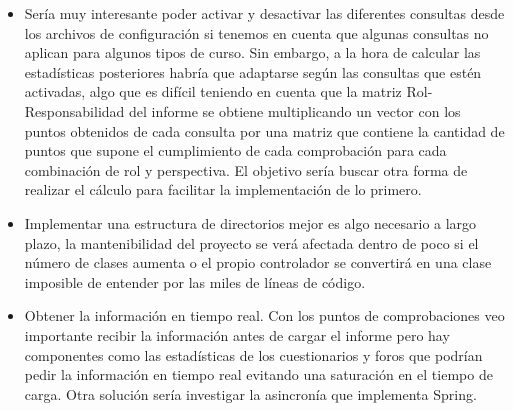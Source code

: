 \begin{itemize}
	\item
	Sería muy interesante poder activar y desactivar las diferentes consultas desde los archivos de configuración si tenemos en cuenta que algunas consultas no aplican para algunos tipos de curso. Sin embargo, a la hora de calcular las estadísticas posteriores habría que adaptarse según las consultas que estén activadas, algo que es difícil teniendo en cuenta que la matriz Rol-Responsabilidad del informe se obtiene multiplicando un vector con los puntos obtenidos de cada consulta por una matriz que contiene la cantidad de puntos que supone el cumplimiento de cada comprobación para cada combinación de rol y perspectiva. El objetivo sería buscar otra forma de realizar el cálculo para facilitar la implementación de lo primero.
	\item
	Implementar una estructura de directorios mejor es algo necesario a largo plazo, la mantenibilidad del proyecto se verá afectada dentro de poco si el número de clases aumenta o el propio controlador se convertirá en una clase imposible de entender por las miles de líneas de código.
	\item
	Obtener la información en tiempo real. Con los puntos de comprobaciones veo importante recibir la información antes de cargar el informe pero hay componentes como las estadísticas de los cuestionarios y foros que podrían pedir la información en tiempo real evitando una saturación en el tiempo de carga. Otra solución sería investigar la asincronía que implementa Spring.
\end{itemize}